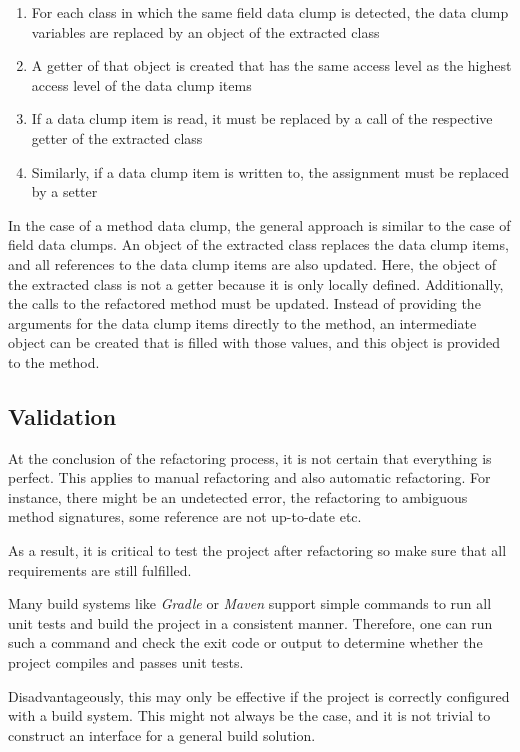 \begin{enumerate}
    \item For each class in which the same field data clump is detected, the data clump variables are replaced by an object of the extracted class
    \item A getter of that object is created that has the same access level as the highest access level of the data clump items
    \item If a data clump item is read, it must be replaced by a call of the respective getter of the extracted class
    \item Similarly, if a data clump item is written to, the assignment must be replaced by a setter
\end{enumerate}



In the case of a method data clump, the general approach is similar to the case of field data clumps. An object of the extracted class replaces the data clump items, and all references to the data clump items are also updated. Here, the object of the extracted class is not a getter because it is only locally defined. Additionally, the calls to the refactored method must be updated. Instead of providing the arguments for the data clump items directly to the method, an intermediate object can be created that is filled with those values, and this object is provided to the method. 

\subsection{Validation}

At the conclusion of the refactoring process, it is not certain that everything is perfect. This applies to manual refactoring and also automatic refactoring. For instance, there might be an undetected error, the refactoring to ambiguous method signatures, some reference are not up-to-date etc.

As a result, it is critical to test the project after refactoring so make sure that all requirements are still fulfilled.

Many build systems like \textit{Gradle} or \textit{Maven} support simple commands to run all unit tests and build the project in a consistent manner.  Therefore, one can run such a command and check the exit code or output to determine whether the project compiles and passes unit tests.

Disadvantageously, this may only be effective if the project is correctly configured with a build system. This might not always be the case, and it is not trivial to construct an interface for a general build solution. 


